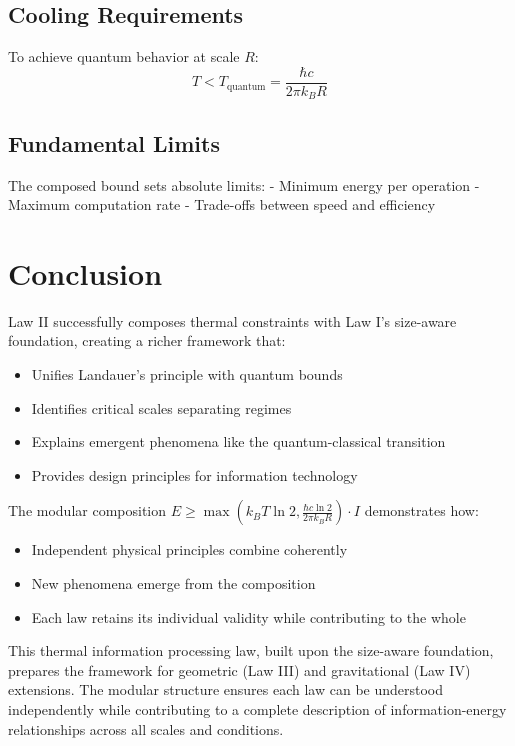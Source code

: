 \documentclass[11pt,a4paper]{article}
\theoremstyle{definition}
\begin{document}
\subsection{Cooling Requirements}

To achieve quantum behavior at scale $R$:
\begin{equation}
T < T_{\text{quantum}} = \frac{\hbar c}{2\pi k_B R}
\end{equation}

\subsection{Fundamental Limits}

The composed bound sets absolute limits:
- Minimum energy per operation
- Maximum computation rate
- Trade-offs between speed and efficiency

\section{Conclusion}

Law II successfully composes thermal constraints with Law I's size-aware foundation, creating a richer framework that:

\begin{itemize}
\item Unifies Landauer's principle with quantum bounds
\item Identifies critical scales separating regimes
\item Explains emergent phenomena like the quantum-classical transition
\item Provides design principles for information technology
\end{itemize}

The modular composition $E \geq \max(k_B T \ln 2, \frac{\hbar c \ln 2}{2\pi k_B R}) \cdot I$ demonstrates how:
\begin{itemize}
\item Independent physical principles combine coherently
\item New phenomena emerge from the composition
\item Each law retains its individual validity while contributing to the whole
\end{itemize}

This thermal information processing law, built upon the size-aware foundation, prepares the framework for geometric (Law III) and gravitational (Law IV) extensions. The modular structure ensures each law can be understood independently while contributing to a complete description of information-energy relationships across all scales and conditions.
\end{document}

